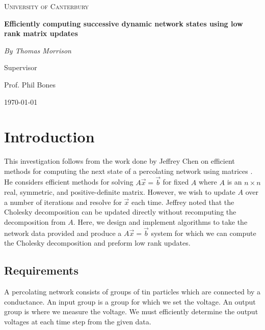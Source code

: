 \documentclass[11pt]{article}
\date{\today}
\begin{document}
\begin{titlepage}
    \centering
    {\scshape\LARGE University of Canterbury\par}
    \vspace{1cm}
    \vspace{5cm}
    {\huge\bfseries Efficiently computing successive dynamic network states using low rank matrix updates\par}
    \vspace{2cm}
    {\Large\itshape By Thomas Morrison\par}
    \vfill
    
    \vspace{0.5cm}
    Supervisor\par
    \par
    Prof. Phil Bones
    \vfill

    {\large \today\par}
\end{titlepage}

\newpage
\tableofcontents

\newpage
{}

\setcounter{page}{1}

\section{Introduction}
This investigation follows from the work done by Jeffrey Chen on efficient methods for computing the next state of a percolating network using matrices \cite{jc}. He considers efficient methods for solving $A\vec x=\vec b$ for fixed $A$ where $A$ is an $n\times n$ real, symmetric, and positive-definite matrix. However, we wish to update $A$ over a number of iterations and resolve for $\vec x$ each time. Jeffrey noted that the Cholesky decomposition can be updated directly without recomputing the decomposition from $A$. Here, we design and implement algorithms to take the network data provided and produce a $A\vec x=\vec b$ system for which we can compute the Cholesky decomposition and preform low rank updates.

\subsection{Requirements}
A percolating network consists of groups of tin particles which are connected by a conductance. An input group is a group for which we set the voltage. An output group is where we measure the voltage. We must efficiently determine the output voltages at each time step from the given data.
\end{document}
